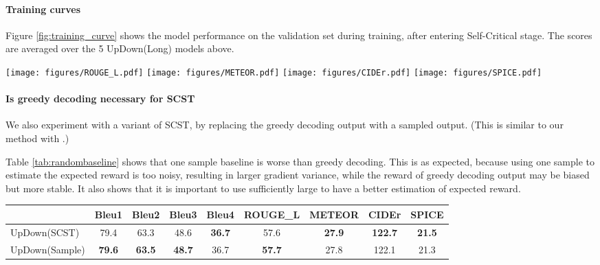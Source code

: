 \documentclass[11pt,a4paper]{article}
\begin{document}
\paragraph{Training curves}

Figure \ref{fig:training_curve} shows the model performance on the validation set during training, after entering Self-Critical stage. The scores are averaged over the 5 UpDown(Long) models above.

\begin{figure*}[t]
\centering
\texttt{[image: figures/ROUGE\_L.pdf]}
\texttt{[image: figures/METEOR.pdf]}
\texttt{[image: figures/CIDEr.pdf]}
\texttt{[image: figures/SPICE.pdf]}
\caption{Performance on validation set during training. (With UpDown(Long) + greedy decoding)}
\label{fig:training_curve}
\end{figure*}

\paragraph{Is greedy decoding necessary for SCST}
We also experiment with a variant of SCST, by replacing the greedy decoding output with a sampled output. (This is similar to our method with .)

Table \ref{tab:randombaseline} shows that one sample baseline is worse than greedy decoding. This is as expected, because using one sample to estimate the expected reward is too noisy, resulting in larger gradient variance, while the reward of greedy decoding output may be biased but more stable. It also shows that it is important to use sufficiently large  to have a better estimation of expected reward.

\begin{table*}[htbp]\small
  \centering
    \begin{tabular}{lcccccccc}
          & \multicolumn{1}{c}{Bleu1} & \multicolumn{1}{c}{Bleu2} & \multicolumn{1}{c}{Bleu3} & \multicolumn{1}{c}{Bleu4} & \multicolumn{1}{c}{ROUGE\_L} & \multicolumn{1}{c}{METEOR} & \multicolumn{1}{c}{CIDEr} & \multicolumn{1}{c}{SPICE} \\
    \midrule
    UpDown(SCST) & 79.4  & 63.3  & 48.6  & \textbf{36.7} & 57.6  & \textbf{27.9} & \textbf{122.7} & \textbf{21.5} \\
    UpDown(Sample) & \textbf{79.6} & \textbf{63.5} & \textbf{48.7} & 36.7 & \textbf{57.7} & 27.8  & 122.1 & 21.3 \\
    \bottomrule
    \end{tabular}\caption{Replacing the greedy decoding output  in SCST with a separately drawn sample .}
  \label{tab:randombaseline}\end{table*}
\end{document}
